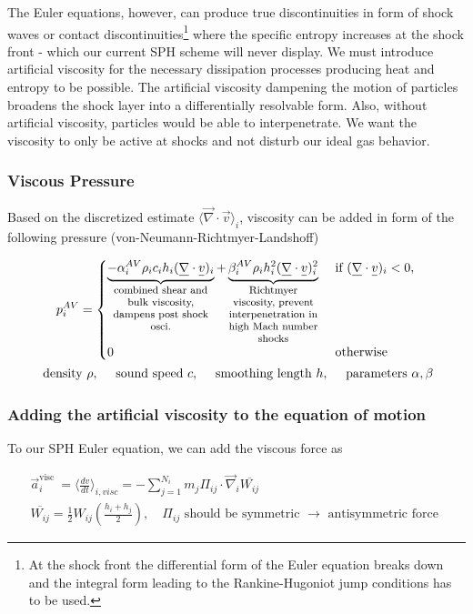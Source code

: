 The Euler equations, however, can produce true discontinuities in form of shock waves or contact discontinuities\footnote{At the shock front the differential form of the Euler equation breaks down and the integral form leading to the Rankine-Hugoniot jump conditions has to be used.} where the specific entropy increases at the shock front - which our current SPH scheme will never display.
We must introduce artificial viscosity for the necessary dissipation processes producing heat and entropy to be possible. The artificial viscosity dampening the motion of particles broadens the shock layer into a differentially resolvable form.
Also, without artificial viscosity, particles would be able to interpenetrate.
We want the viscosity to only be active at shocks and not disturb our ideal gas behavior.

\subsubsection{Viscous Pressure}
Based on the discretized estimate $\langle \vec{\nabla} \cdot \vec{v} \rangle_i$, viscosity can be added
in form of the following pressure (von-Neumann-Richtmyer-Landshoff)

\begin{equation}
    \begin{gathered}
    p_i^{A V}= \begin{cases}\explain{-\alpha_i^{A V} \rho_i c_i h_i(\vec{\nabla} \cdot \vec{v})_i}{combined shear and bulk viscosity, dampens post shock osci.}+\explain{\beta_i^{A V} \rho_i h_i^2(\vec{\nabla} \cdot \vec{v})_i^2}{Richtmyer viscosity, prevent interpenetration in high Mach number shocks} & \text { if }(\vec{\nabla} \cdot \vec{v})_i<0, \\
    0 & \text { otherwise }\end{cases} \\
    \text { density } \rho, \quad \text { sound speed } c, \quad \text { smoothing length } h, \quad \text { parameters } \alpha, \beta
    \end{gathered}
\end{equation}

\subsubsection{Adding the artificial viscosity to the equation of motion}
To our SPH Euler equation, we can add the viscous force as

\begin{equation}
    \begin{gathered}
        \vec{a}_i^{\text {visc }}=\langle\frac{dv}{d t}\rangle_{i,v i s c}=-\sum_{j=1}^{N_i} m_j \Pi_{i j} \cdot \vec{\nabla}_i \overline{W_{i j}} \\
        \overline{W_{i j}}=\frac{1}{2} W_{i j}\left(\frac{h_i+h_j}{2}\right), \quad \Pi_{i j} \text { should be symmetric } \rightarrow \text { antisymmetric force }
    \end{gathered}
\end{equation}

